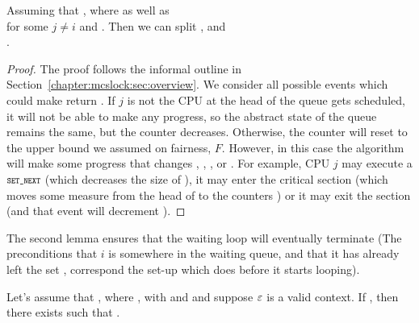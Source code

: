 \begin{lemma}
\label{lem:chapter:mcslock:MCS_CalLock_progress_onestep}
Assuming that , where
 as well as  \\
for some $j\neq i$ and  .
Then we can split , and\\
.
\end{lemma}

\begin{proof}
The proof follows the informal outline in
Section~\ref{chapter:mcslock:sec:overview}.  We consider all possible events
 which could make  return . If $j$ is not the 
CPU at the head of the queue gets scheduled, it will not be
able to make any progress, so the abstract state of the queue remains the same,
but the counter  decreases.
Otherwise, the counter  will reset to the upper bound we assumed on fairness, $F$. 
However, in this case the algorithm will make some progress that changes , , , or .
For example, CPU $j$ may execute a $\SETNEXT$ (which decreases the size of
), it may enter the critical section (which moves some measure from
the head of  to the counters ) or it may exit the section
(and that event will decrement ).
\end{proof}


The second lemma ensures that the waiting loop will eventually
terminate (The preconditions that $i$ is somewhere in the waiting queue,
and that it has already left the set , correspond the set-up
which  does before it starts looping).

\begin{lemma}
\label{lem:chapter:mcslock:CalWaitGet_exist'}
Let's assume that , where
, with  and  and suppose ${\varepsilon}$ is a valid
context. If , then there exists  such
that .
\end{lemma}


